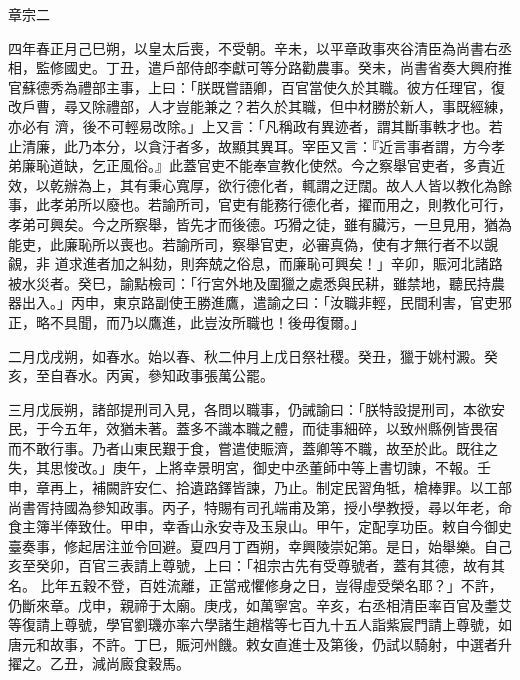 
\begin{pinyinscope}

 章宗二



 四年春正月己巳朔，以皇太后喪，不受朝。辛未，以平章政事夾谷清臣為尚書右丞相，監修國史。丁丑，遣戶部侍郎李獻可等分路勸農事。癸未，尚書省奏大興府推官蘇德秀為禮部主事，上曰：「朕既嘗語卿，百官當使久於其職。彼方任理官，復改戶曹，尋又除禮部，人才豈能兼之？若久於其職，但中材勝於新人，事既經練，亦必有
 濟，後不可輕易改除。」上又言：「凡稱政有異迹者，謂其斷事軼才也。若止清廉，此乃本分，以貪汙者多，故顯其異耳。宰臣又言：『近言事者謂，方今孝弟廉恥道缺，乞正風俗。』此蓋官吏不能奉宣教化使然。今之察舉官吏者，多責近效，以乾辦為上，其有秉心寬厚，欲行德化者，輒謂之迂闊。故人人皆以教化為餘事，此孝弟所以廢也。若諭所司，官吏有能務行德化者，擢而用之，則教化可行，孝弟可興矣。今之所察舉，皆先才而後德。巧猾之徒，雖有臟污，一旦見用，猶為能吏，此廉恥所以喪也。若諭所司，察舉官吏，必審真偽，使有才無行者不以覬覦，非
 道求進者加之糾劾，則奔兢之俗息，而廉恥可興矣！」辛卯，賑河北諸路被水災者。癸巳，諭點檢司：「行宮外地及圍獵之處悉與民耕，雖禁地，聽民持農器出入。」丙申，東京路副使王勝進鷹，遣諭之曰：「汝職非輕，民間利害，官吏邪正，略不具聞，而乃以鷹進，此豈汝所職也！後毋復爾。」



 二月戊戌朔，如春水。始以春、秋二仲月上戊日祭社稷。癸丑，獵于姚村澱。癸亥，至自春水。丙寅，參知政事張萬公罷。



 三月戊辰朔，諸部提刑司入見，各問以職事，仍誡諭曰：「朕特設提刑司，本欲安民，于今五年，效猶未著。蓋多不識本職之體，而徒事細碎，以致州縣例皆畏宿
 而不敢行事。乃者山東民艱于食，嘗遣使賑濟，蓋卿等不職，故至於此。既往之失，其思悛改。」庚午，上將幸景明宮，御史中丞董師中等上書切諫，不報。壬申，章再上，補闕許安仁、拾遺路鐸皆諫，乃止。制定民習角牴，槍棒罪。以工部尚書胥持國為參知政事。丙子，特賜有司孔端甫及第，授小學教授，尋以年老，命食主簿半俸致仕。甲申，幸香山永安寺及玉泉山。甲午，定配享功臣。敕自今御史臺奏事，修起居注並令回避。夏四月丁酉朔，幸興陵崇妃第。是日，始舉樂。自己亥至癸卯，百官三表請上尊號，上曰：「祖宗古先有受尊號者，蓋有其德，故有其名。
 比年五穀不登，百姓流離，正當戒懼修身之日，豈得虛受榮名耶？」不許，仍斷來章。戊申，親禘于太廟。庚戌，如萬寧宮。辛亥，右丞相清臣率百官及耋艾等復請上尊號，學官劉璣亦率六學諸生趙楷等七百九十五人詣紫宸門請上尊號，如唐元和故事，不許。丁巳，賑河州饑。敕女直進士及第後，仍試以騎射，中選者升擢之。乙丑，減尚廄食穀馬。




\end{pinyinscope}
